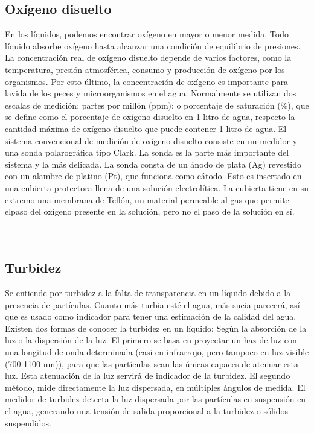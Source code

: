 \documentclass[12pt]{book}
\begin{document}
\subsection{Oxígeno disuelto}

En los líquidos, podemos encontrar oxígeno en mayor o menor medida. Todo
líquido absorbe oxígeno hasta alcanzar una condición de equilibrio de presiones.
La concentración real de oxígeno disuelto depende de varios factores, como la temperatura, presión atmosférica, consumo y producción de oxígeno por los organismos. Por esto último, la concentración de oxígeno es importante para lavida de los peces y microorganismos en el agua.
Normalmente se utilizan dos escalas de medición: partes por millón (ppm); o porcentaje de saturación (\%), que se define como el porcentaje de oxígeno disuelto en 1 litro de agua, respecto la cantidad máxima de oxígeno disuelto que puede contener 1 litro de agua.
El sistema convencional de medición de oxígeno disuelto consiste en un medidor y una sonda polarográfica tipo Clark. La sonda es la parte más importante del sistema y la más delicada. La sonda consta de un ánodo de plata (Ag) revestido con un alambre de platino (Pt), que funciona como cátodo. Esto es insertado en una cubierta protectora llena de una solución electrolítica. La cubierta tiene en su extremo una membrana de Teflón, un material permeable al gas que permite elpaso del oxígeno presente en la solución, pero no el paso de la solución en sí.  \\ 
\\
\\
\subsection{Turbidez}
Se entiende por turbidez a la falta de transparencia en un líquido debido a la presencia de partículas. Cuanto más turbia esté el agua, más sucia parecerá, así que es usado como indicador para tener una estimación de la calidad del agua.
Existen dos formas de conocer la turbidez en un líquido: Según la absorción de la luz o la dispersión de la luz.
El primero se basa en proyectar un haz de luz con una longitud de onda determinada (casi en infrarrojo, pero tampoco en luz visible (700-1100 nm)),
para que las partículas sean las únicas capaces de atenuar esta luz. Esta atenuación de la luz servirá de indicador de la turbidez.
El segundo método, mide directamente la luz dispersada, en múltiples ángulos de medida. El medidor de turbidez detecta la luz dispersada por las partículas en suspensión en el agua, generando una tensión de salida proporcional a la turbidez o sólidos suspendidos.
\end{document}
